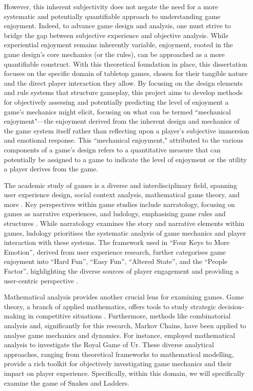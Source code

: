 However, this inherent subjectivity does not negate the need for a more systematic and potentially quantifiable approach to understanding game enjoyment. Indeed, to advance game design and analysis, one must strive to bridge the gap between subjective experience and objective analysis. While experiential enjoyment remains inherently variable, enjoyment, rooted in the game design's core mechanics (or the rules), can be approached as a more quantifiable construct. With this theoretical foundation in place, this dissertation focuses on the specific domain of tabletop games, chosen for their tangible nature and the direct player interaction they allow. By focusing on the design elements and rule systems that structure gameplay, this project aims to develop methods for objectively assessing and potentially predicting the level of enjoyment a game's mechanics might elicit, focusing on what can be termed ``mechanical enjoyment"—the enjoyment derived from the inherent design and mechanics of the game system itself rather than reflecting upon a player's subjective immersion and emotional response.  This ``mechanical enjoyment," attributed to the various components of a game's design refers to a quantitative measure that can potentially be assigned to a game to indicate the level of enjoyment or the utility a player derives from the game. 

The academic study of games is a diverse and interdisciplinary field, spanning user experience design, social context analysis, mathematical game theory, and more \autocite{vlachopoulosEffectGamesSimulations2017}. Key perspectives within game studies include narratology, focusing on games as narrative experiences, and ludology, emphasising game rules and structures \autocite{mcmanusNarratologyLudologyCompeting2006a}. While narratology examines the story and narrative elements within games, ludology prioritises the systematic analysis of game mechanics and player interaction with these systems. The framework used in ``Four Keys to More Emotion'', derived from user experience research, further categorises game enjoyment into “Hard Fun”, “Easy Fun”, “Altered State”, and the “People Factor”, highlighting the diverse sources of player engagement and providing a user-centric perspective \autocites{lazzaroWhyWePlay2004a}.

Mathematical analysis provides another crucial lens for examining games. Game theory, a branch of applied mathematics, offers tools to study strategic decision-making in competitive situations \autocite{vonneumannTheoryGamesEconomic1944a}.  Furthermore, methods like combinatorial analysis and, significantly for this research, Markov Chains, have been applied to analyse game mechanics and dynamics.  For instance, \textcite{raposoMathematicalAnalysisRoyal2023a} employed mathematical analysis to investigate the Royal Game of Ur. These diverse analytical approaches, ranging from theoretical frameworks to mathematical modelling, provide a rich toolkit for objectively investigating game mechanics and their impact on player experience. Specifically, within this domain, we will specifically examine the game of Snakes and Ladders.

